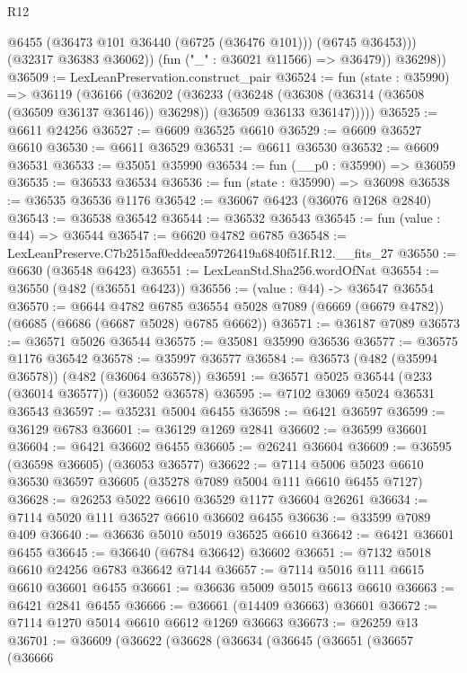 \begin{lexlean}{R12}
\begin{coremodule}
                @6455
                (@36473 @101 @36440 (@6725 (@36476 @101)))
                (@6745 @36453)))
            (@32317 @36383 @36062))
          (fun ("_" : @36021 @11566) => @36479))
        @36298))
@36509 := LexLeanPreservation.construct_pair
@36524 := fun (state : @35990) =>
  @36119
    (@36166
      (@36202
        (@36233
          (@36248
            (@36308 (@36314 (@36508 (@36509 @36137 @36146)) @36298))
            (@36509 @36133 @36147)))))
@36525 := @6611 @24256
@36527 := @6609 @36525 @6610
@36529 := @6609 @36527 @6610
@36530 := @6611 @36529
@36531 := @6611 @36530
@36532 := @6609 @36531
@36533 := @35051 @35990
@36534 := fun (__p0 : @35990) => @36059
@36535 := @36533 @36534
@36536 := fun (state : @35990) => @36098
@36538 := @36535 @36536 @1176
@36542 := @36067 @6423 (@36076 @1268 @2840)
@36543 := @36538 @36542
@36544 := @36532 @36543
@36545 := fun (value : @44) => @36544
@36547 := @6620 @4782 @6785
@36548 := LexLeanPreserve.C7b2515af0eddeea59726419a6840f51f.R12.__fits_27
@36550 := @6630 (@36548 @6423)
@36551 := LexLeanStd.Sha256.wordOfNat
@36554 := @36550 (@482 (@36551 @6423))
@36556 := (value : @44) -> @36547 @36554
@36570 := @6644
    @4782
    @6785
    @36554
    @5028
    @7089
    (@6669 (@6679 @4782))
    (@6685 (@6686 (@6687 @5028) @6785 @6662))
@36571 := @36187 @7089
@36573 := @36571 @5026 @36544
@36575 := @35081 @35990 @36536
@36577 := @36575 @1176 @36542
@36578 := @35997 @36577
@36584 := @36573 (@482 (@35994 @36578)) (@482 (@36064 @36578))
@36591 := @36571 @5025 @36544 (@233 (@36014 @36577)) (@36052 @36578)
@36595 := @7102 @3069 @5024 @36531 @36543
@36597 := @35231 @5004 @6455
@36598 := @6421 @36597
@36599 := @36129 @6783
@36601 := @36129 @1269 @2841
@36602 := @36599 @36601
@36604 := @6421 @36602 @6455
@36605 := @26241 @36604
@36609 := @36595 (@36598 @36605) (@36053 @36577)
@36622 := @7114 @5006 @5023 @6610 @36530 @36597 @36605 (@35278 @7089 @5004 @111 @6610 @6455 @7127)
@36628 := @26253 @5022 @6610 @36529 @1177 @36604 @26261
@36634 := @7114 @5020 @111 @36527 @6610 @36602 @6455
@36636 := @33599 @7089 @409
@36640 := @36636 @5010 @5019 @36525 @6610
@36642 := @6421 @36601 @6455
@36645 := @36640 (@6784 @36642) @36602
@36651 := @7132 @5018 @6610 @24256 @6783 @36642 @7144
@36657 := @7114 @5016 @111 @6615 @6610 @36601 @6455
@36661 := @36636 @5009 @5015 @6613 @6610
@36663 := @6421 @2841 @6455
@36666 := @36661 (@14409 @36663) @36601
@36672 := @7114 @1270 @5014 @6610 @6612 @1269 @36663
@36673 := @26259 @13
@36701 := @36609
    (@36622
      (@36628
        (@36634
          (@36645
            (@36651
              (@36657
                (@36666

\end{coremodule}
\end{lexlean}
